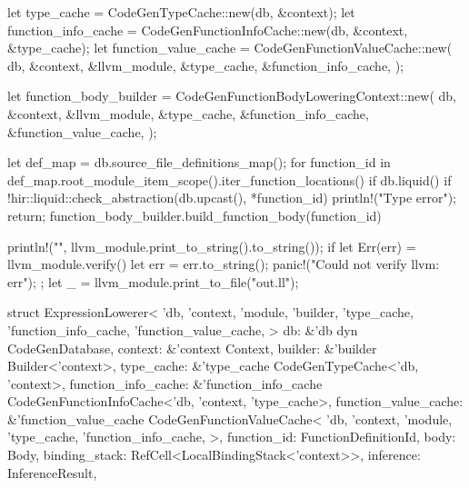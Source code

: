 \documentclass[
  oneside,
  english,
  coorientadorbanca,
  noabntexcite
]{ufsc-thesis-rn46-2019}
\begin{document}
\begin{rustcode}
{    let type_cache = CodeGenTypeCache::new(db, &context);
    let function_info_cache = CodeGenFunctionInfoCache::new(db, &context, &type_cache);
    let function_value_cache = CodeGenFunctionValueCache::new(
        db,
        &context,
        &llvm_module,
        &type_cache,
        &function_info_cache,
    );

    let function_body_builder = CodeGenFunctionBodyLoweringContext::new(
        db,
        &context,
        &llvm_module,
        &type_cache,
        &function_info_cache,
        &function_value_cache,
    );

    let def_map = db.source_file_definitions_map();
    for function_id in def_map.root_module_item_scope().iter_function_locations() {
        if db.liquid() {
            if !hir::liquid::check_abstraction(db.upcast(), *function_id) {
                println!("Type error");
                return;
            }
        }
        function_body_builder.build_function_body(function_id)
    }

    println!("{}", llvm_module.print_to_string().to_string());
    if let Err(err) = llvm_module.verify() {
        let err = err.to_string();
        panic!("Could not verify llvm: {err}");
    };
    let _ = llvm_module.print_to_file("out.ll");
}

struct ExpressionLowerer<
    'db,
    'context,
    'module,
    'builder,
    'type_cache,
    'function_info_cache,
    'function_value_cache,
> {
    db: &'db dyn CodeGenDatabase,
    context: &'context Context,
    builder: &'builder Builder<'context>,
    type_cache: &'type_cache CodeGenTypeCache<'db, 'context>,
    function_info_cache: &'function_info_cache CodeGenFunctionInfoCache<'db, 'context, 'type_cache>,
    function_value_cache: &'function_value_cache CodeGenFunctionValueCache<
        'db,
        'context,
        'module,
        'type_cache,
        'function_info_cache,
    >,
    function_id: FunctionDefinitionId,
    body: Body,
    binding_stack: RefCell<LocalBindingStack<'context>>,
    inference: InferenceResult,
}


\end{rustcode}
\end{document}
